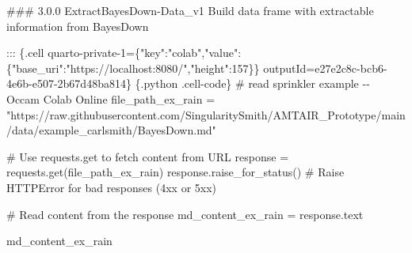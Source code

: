 \documentclass[
  11pt,
  letterpaper,
]{book}
\newenvironment{Shaded}{\begin{snugshade}}{\end{snugshade}}
\newcommand{\DataTypeTok}[1]{\textcolor[rgb]{0.68,0.00,0.00}{#1}}
\newcommand{\DecValTok}[1]{\textcolor[rgb]{0.68,0.00,0.00}{#1}}
\newcommand{\ErrorTok}[1]{\textcolor[rgb]{0.68,0.00,0.00}{#1}}
\newcommand{\FunctionTok}[1]{\textcolor[rgb]{0.28,0.35,0.67}{#1}}
\newcommand{\StringTok}[1]{\textcolor[rgb]{0.13,0.47,0.30}{#1}}
\begin{document}
\begin{Shaded}
\begin{Highlighting}[]
\ErrorTok{\#\#\#} \ErrorTok{3.0.0} \ErrorTok{ExtractBayesDown{-}Data\_v1}
\ErrorTok{Build} \ErrorTok{data} \ErrorTok{frame} \ErrorTok{with} \ErrorTok{extractable} \ErrorTok{information} \ErrorTok{from} \ErrorTok{BayesDown}

\ErrorTok{:::} \FunctionTok{\{}\ErrorTok{.cell} \ErrorTok{quarto{-}private{-}1=\textquotesingle{}\{}\DataTypeTok{"key"}\FunctionTok{:}\StringTok{"colab"}\FunctionTok{,}\DataTypeTok{"value"}\FunctionTok{:\{}\DataTypeTok{"base\_uri"}\FunctionTok{:}\StringTok{"https://localhost:8080/"}\FunctionTok{,}\DataTypeTok{"height"}\FunctionTok{:}\DecValTok{157}\FunctionTok{\}\}}\ErrorTok{\textquotesingle{}} \ErrorTok{outputId=\textquotesingle{}e27e2c8c{-}bcb6{-}4e6b{-}e507{-}2b67d48ba814\textquotesingle{}\}}
\ErrorTok{\textasciigrave{}\textasciigrave{}\textasciigrave{}} \FunctionTok{\{}\ErrorTok{.python} \ErrorTok{.cell{-}code}\FunctionTok{\}}
\ErrorTok{\#} \ErrorTok{read} \ErrorTok{sprinkler} \ErrorTok{example} \ErrorTok{{-}{-}} \ErrorTok{Occam} \ErrorTok{Colab} \ErrorTok{Online}
\ErrorTok{file\_path\_ex\_rain} \ErrorTok{=} \ErrorTok{"https://raw.githubusercontent.com/SingularitySmith/AMTAIR\_Prototype/main/data/example\_carlsmith/BayesDown.md"}

\ErrorTok{\#} \ErrorTok{Use} \ErrorTok{requests.get} \ErrorTok{to} \ErrorTok{fetch} \ErrorTok{content} \ErrorTok{from} \ErrorTok{URL}
\ErrorTok{response} \ErrorTok{=} \ErrorTok{requests.get(file\_path\_ex\_rain)}
\ErrorTok{response.raise\_for\_status()}  \ErrorTok{\#} \ErrorTok{Raise} \ErrorTok{HTTPError} \ErrorTok{for} \ErrorTok{bad} \ErrorTok{responses} \ErrorTok{(4xx} \ErrorTok{or} \ErrorTok{5xx)}

\ErrorTok{\#} \ErrorTok{Read} \ErrorTok{content} \ErrorTok{from} \ErrorTok{the} \ErrorTok{response}
\ErrorTok{md\_content\_ex\_rain} \ErrorTok{=} \ErrorTok{response.text}

\ErrorTok{md\_content\_ex\_rain}
\end{Highlighting}
\end{Shaded}
\end{document}
